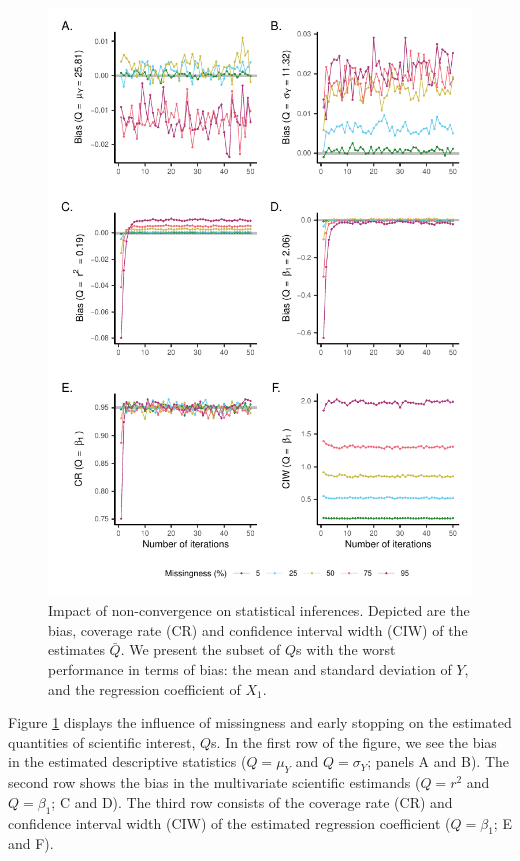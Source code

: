 \documentclass[Royal,times,sageh]{sagej}
\begin{document}
\begin{figure}

{\centering \includegraphics{2.Manuscript_files/figure-latex/Qs-1} 

}

\caption{Impact of non-convergence on statistical inferences. Depicted are the bias, coverage rate (CR) and confidence interval width (CIW) of the estimates $\bar{Q}$. We present the subset of $Q$s with the worst performance in terms of bias: the mean and standard deviation of $Y$, and the regression coefficient of $X_1$.}\label{fig:Qs}
\end{figure}

Figure \ref{fig:Qs} displays the influence of missingness and early stopping on the estimated quantities of scientific interest, \(Q\)s. In the first row of the figure, we see the bias in the estimated descriptive statistics (\(Q=\mu_Y\) and \(Q=\sigma_Y\); panels A and B). The second row shows the bias in the multivariate scientific estimands (\(Q=r^2\) and \(Q=\beta_1\); C and D). The third row consists of the coverage rate (CR) and confidence interval width (CIW) of the estimated regression coefficient (\(Q=\beta_1\); E and F).
\end{document}
